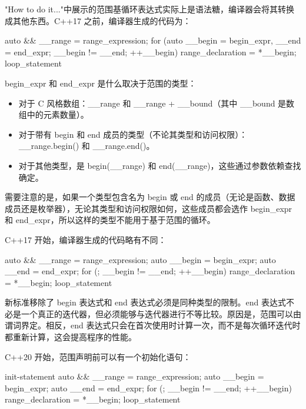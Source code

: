 
"How to do it..."中展示的范围基循环表达式实际上是语法糖，编译器会将其转换成其他东西。C++17 之前，编译器生成的代码为：

\begin{cpp}
{
    auto && __range = range_expression;
    for (auto __begin = begin_expr, __end = end_expr;
    __begin != __end; ++__begin) {
        range_declaration = *__begin;
        loop_statement
    }
}
\end{cpp}

begin\_expr 和 end\_expr 是什么取决于范围的类型：

\begin{itemize}
\item
对于 C 风格数组：\_\_range 和 \_\_range + \_\_bound（其中 \_\_bound 是数组中的元素数量）。

\item
对于带有 begin 和 end 成员的类型（不论其类型和访问权限）：\_\_range.begin() 和 \_\_range.end()。

\item
对于其他类型，是 begin(\_\_range) 和 end(\_\_range)，这些通过参数依赖查找确定。
\end{itemize}

需要注意的是，如果一个类型包含名为 begin 或 end 的成员（无论是函数、数据成员还是枚举器），无论其类型和访问权限如何，这些成员都会选作 begin\_expr 和 end\_expr，所以这样的类型不能用于基于范围的循环。

C++17 开始，编译器生成的代码略有不同：

\begin{cpp}
{
    auto && __range = range_expression;
    auto __begin = begin_expr;
    auto __end = end_expr;
    for (; __begin != __end; ++__begin) {
        range_declaration = *__begin;
        loop_statement
    }
}
\end{cpp}

新标准移除了 begin 表达式和 end 表达式必须是同种类型的限制。end 表达式不必是一个真正的迭代器，但必须能够与迭代器进行不等比较。原因是，范围可以由谓词界定。相反，end 表达式只会在首次使用时计算一次，而不是每次循环迭代时都重新计算，这会提高程序的性能。

C++20 开始，范围声明前可以有一个初始化语句：

\begin{cpp}
{
    init-statement
    auto && __range = range_expression;
    auto __begin = begin_expr;
    auto __end = end_expr;
    for (; __begin != __end; ++__begin) {
        range_declaration = *__begin;
        loop_statement
    }
}
\end{cpp}

